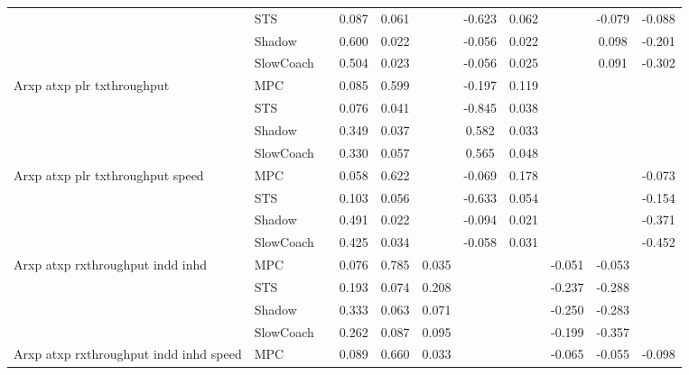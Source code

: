 \begin{tabular}{|l|l|*{9}{c|}}
                              & STS &       &     0.087 &     0.061 &     & -0.623 &  0.062 &      &  -0.079 &   -0.088 \\
                              & Shadow &       &     0.600 &     0.022 &     & -0.056 &  0.022 &      &   0.098 &   -0.201 \\
                              & SlowCoach &       &     0.504 &     0.023 &     & -0.056 &  0.025 &      &   0.091 &   -0.302 \\
\midrule
Arxp atxp plr txthroughput    & MPC &       &     0.085 &     0.599 &     & -0.197 &  0.119 &      &      &       \\
                              & STS &       &     0.076 &     0.041 &     & -0.845 &  0.038 &      &      &       \\
                              & Shadow &       &     0.349 &     0.037 &     &  0.582 &  0.033 &      &      &       \\
                              & SlowCoach &       &     0.330 &     0.057 &     &  0.565 &  0.048 &      &      &       \\
\midrule
Arxp atxp plr txthroughput speed    & MPC &       &     0.058 &     0.622 &     & -0.069 &  0.178 &      &      &   -0.073 \\
                              & STS &       &     0.103 &     0.056 &     & -0.633 &  0.054 &      &      &   -0.154 \\
                              & Shadow &       &     0.491 &     0.022 &     & -0.094 &  0.021 &      &      &   -0.371 \\
                              & SlowCoach &       &     0.425 &     0.034 &     & -0.058 &  0.031 &      &      &   -0.452 \\
\midrule
Arxp atxp rxthroughput indd inhd    & MPC &       &     0.076 &     0.785 &  0.035 &     &     &  -0.051 &  -0.053 &       \\
                              & STS &       &     0.193 &     0.074 &  0.208 &     &     &  -0.237 &  -0.288 &       \\
                              & Shadow &       &     0.333 &     0.063 &  0.071 &     &     &  -0.250 &  -0.283 &       \\
                              & SlowCoach &       &     0.262 &     0.087 &  0.095 &     &     &  -0.199 &  -0.357 &       \\
\midrule
Arxp atxp rxthroughput indd inhd speed    & MPC &       &     0.089 &     0.660 &  0.033 &     &     &  -0.065 &  -0.055 &   -0.098 \\

\end{tabular}
